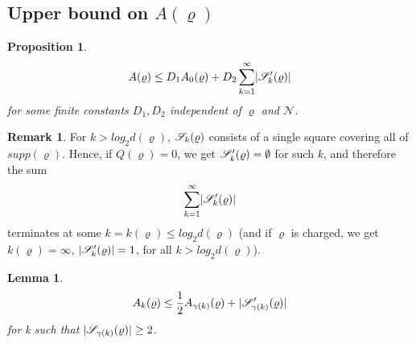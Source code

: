 \documentclass[11pt,reqno]{article}
\DeclarePairedDelimiter\abs{\lvert}{\rvert}%
\newtheorem{lemma}[thm]{Lemma}
\newtheorem{prop}[thm]{Proposition}
\theoremstyle{definition}
\newtheorem*{remark}{Remark}
\numberwithin{equation}{section}
\begin{document}
\subsection{Upper bound on $A(\varrho)$}
\begin{prop} \label{prop:ABound}
\begin{equation} \label{label:eq31}
A(\varrho) \leq D_1 A_0(\varrho) + D_2 \sum_{k=1}^{\infty} \abs{\mathscr{S}^\prime_{k}(\varrho)}
\end{equation}
for some finite constants $D_1, D_2$ independent of $\varrho$ and $\mathscr{N}$.
\end{prop}

\begin{remark}
For $k > log_2 d(\varrho)$, $\mathscr{S}_k(\varrho)$ consists of a single square covering all of $supp(\varrho)$. Hence, if $Q(\varrho) = 0$, we get $\mathscr{S}^\prime_k(\varrho)=\emptyset$ for such $k$, and therefore the sum 
$$\sum_{k=1}^\infty \abs{\SqrsSetTag}$$
terminates at some $k=k(\varrho) \leq log_2d(\varrho)$ (and if $\varrho$ is charged, we get $k(\varrho)=\infty$, $\abs{\SqrsSetTag} = 1$, for all $k > log_2 d(\varrho)$).
\end{remark}


\begin{lemma} \label{lemma:GammaReason}
\begin{equation} \label{label:GammaRec}
A_k(\varrho) \leq \frac{1}{2} A_{\gamma(k)}(\varrho) + \abs{\SqrsSetTagGamma}
\end{equation}
for k such that $\abs{\SqrsSetGamma} \geq 2$.
\end{lemma}
\end{document}
